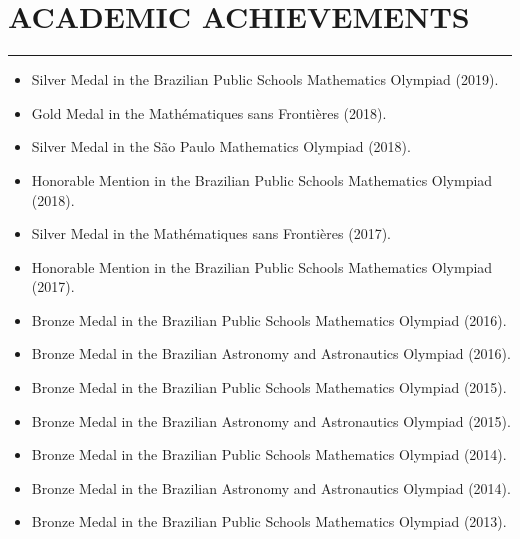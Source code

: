 \documentclass[a4paper,10pt]{article}
\begin{document}
\section*{ACADEMIC ACHIEVEMENTS}
\vspace{-1.5em} %
\noindent\rule{\textwidth}{0.4pt} %
\begin{itemize} 
    \item Silver Medal in the Brazilian Public Schools Mathematics Olympiad (2019).
    \item Gold Medal in the Mathématiques sans Frontières (2018).
    \item Silver Medal in the São Paulo Mathematics Olympiad (2018).
    \item Honorable Mention in the Brazilian Public Schools Mathematics Olympiad (2018).
    \item Silver Medal in the Mathématiques sans Frontières (2017).
    \item Honorable Mention in the Brazilian Public Schools Mathematics Olympiad (2017).
    \item Bronze Medal in the Brazilian Public Schools Mathematics Olympiad (2016).
    \item Bronze Medal in the Brazilian Astronomy and Astronautics Olympiad (2016).
    \item Bronze Medal in the Brazilian Public Schools Mathematics Olympiad (2015).
    \item Bronze Medal in the Brazilian Astronomy and Astronautics Olympiad (2015).
    \item Bronze Medal in the Brazilian Public Schools Mathematics Olympiad (2014).
    \item Bronze Medal in the Brazilian Astronomy and Astronautics Olympiad (2014).
    \item Bronze Medal in the Brazilian Public Schools Mathematics Olympiad (2013).
\end{itemize}
\end{document}
